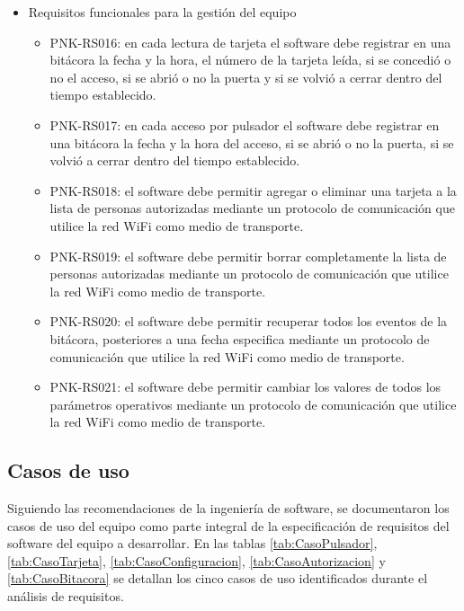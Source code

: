 \begin{itemize}
	\item Requisitos funcionales para la gestión del equipo

	\begin{itemize}
	
		\item PNK-RS016: en cada lectura de tarjeta el software debe registrar en una bitácora la fecha y la hora, el número de la tarjeta leída, si se concedió o no el acceso, si se abrió o no la puerta y si se volvió a cerrar dentro del tiempo establecido.
	
		\item PNK-RS017: en cada acceso por pulsador el software debe registrar en una bitácora la fecha y la hora del acceso, si se abrió o no la puerta, si se volvió a cerrar dentro del tiempo establecido.
	
		\item PNK-RS018: el software debe permitir agregar o eliminar una tarjeta a la lista de personas autorizadas mediante un protocolo de comunicación que utilice la red WiFi como medio de transporte.
	
		\item PNK-RS019: el software debe permitir borrar completamente la lista de personas autorizadas mediante un protocolo de comunicación que utilice la red WiFi como medio de transporte.
	
		\item PNK-RS020: el software debe permitir recuperar todos los eventos de la bitácora, posteriores a una fecha especifica mediante un protocolo de comunicación que utilice la red WiFi como medio de transporte.
	
		\item PNK-RS021: el software debe permitir cambiar los valores de todos los parámetros operativos mediante un protocolo de comunicación que utilice la red WiFi como medio de transporte. 
	\end{itemize}		
\end{itemize}

\subsection{Casos de uso}
\label{sub:CasosDeUso}

Siguiendo las recomendaciones de la ingeniería de software, se documentaron los casos de uso del equipo como parte integral de la especificación de requisitos del software del equipo a desarrollar. En las tablas \ref{tab:CasoPulsador}, \ref{tab:CasoTarjeta}, \ref{tab:CasoConfiguracion}, \ref{tab:CasoAutorizacion} y \ref{tab:CasoBitacora} se detallan los cinco casos de uso identificados durante el análisis de requisitos.

